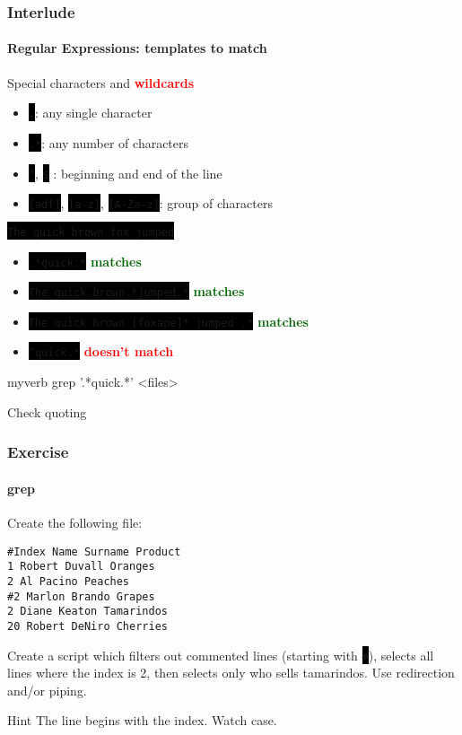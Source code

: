 \documentclass[unknownkeysallowed, 10pt, a4 paper, handout]{beamer}
\newcommand{\green}[1]{\textbf{\textcolor{darkgreen}{#1}}}
\newcommand{\red}[1]{\textbf{\textcolor{red}{#1}}}
\newcommand{\focus}[1]{\textbf{\textcolor{red}{#1}}}
\newcommand{\code}[1]{\colorbox{black}{\color{green}\texttt{#1}}}
\newcommand{\codeine}[1]{
\colorbox{black}{\color{green} \BUseVerbatim{#1} }
}
\begin{document}
\begin{frame}[fragile=singleslide]
  \frametitle{Interlude}
  \framesubtitle{Regular Expressions: templates to match}

  \footnotesize{
    \begin{exampleblock}{}
    Special characters and \focus{wildcards}
    \begin{itemize}
      \item \code{.}: any single character
      \item \code{.*}: any number of characters
      \item \code{\^}, \code{\$} : beginning and end of the line
      \item \code{[adf]}, \code{[a-z]}, \code{[A-Za-z]}: group of characters
    \end{itemize}
  \end{exampleblock}

    \begin{exampleblock}{}
    \code{The quick brown fox jumped}
    \begin{itemize}
      \item \code{.*quick.*} \green{matches}
      \item \code{The quick brown.*jumped.*} \green{matches}
      \item \code{The quick brown [foxape]* jumped .*} \green{matches}
      \item \code{\^{}quick.*} \red{doesn't match}
    \end{itemize}
  \end{exampleblock}

  \begin{SaveVerbatim}{myverb}
grep '.*quick.*' <files>
  \end{SaveVerbatim}
  \begin{alertblock}{Check quoting}
    \codeine{myverb}
  \end{alertblock}
  }
\end{frame}

\begin{frame}[fragile=singleslide]
  \frametitle{Exercise}
  \framesubtitle{grep}

  \begin{block}{}
    Create the following file:
    \begin{verbatim}
#Index Name Surname Product
1 Robert Duvall Oranges
2 Al Pacino Peaches
#2 Marlon Brando Grapes
2 Diane Keaton Tamarindos
20 Robert DeNiro Cherries
    \end{verbatim}
  \end{block}

  \begin{exampleblock}{}
    Create a script which filters out commented lines (starting with
    \code{\#}), selects all lines where the index is 2, then selects only who
    sells tamarindos. Use redirection and/or piping.
  \end{exampleblock}

  \begin{alertblock}{Hint}
    The line begins with the index. Watch case.
  \end{alertblock}
\end{frame}
\end{document}
